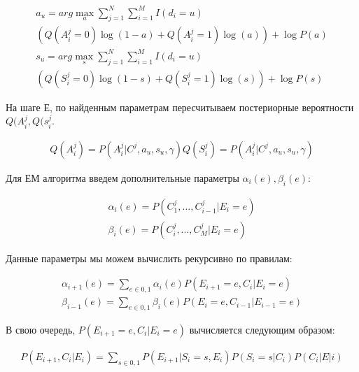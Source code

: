 \begin{subequations}
\begin{align}
	a_u=arg \max_a \sum_{j=1}^{N}\sum_{i=1}^{M}I(d_i=u) \nonumber \\
	(Q(A_{i}^{j}=0)\log(1-a)+Q(A_{i}^{j}=1)\log(a))+\log P(a) \\
	s_u=arg \max_s \sum_{j=1}^{N}\sum_{i=1}^{M}I(d_i=u) \nonumber \\
	(Q(S_{i}^{j}=0)\log(1-s)+Q(S_{i}^{j}=1)\log(s))+\log P(s)
\end{align}
\end{subequations}

На шаге Е, по найденным параметрам пересчитываем постериорные вероятности  $Q(A_{i}^{j},Q(s_{i}^{j}$.

\begin{subequations}
\begin{align}
	Q(A_{i}^{j})=P(A_{i}^{j}|C^j,a_u,s_u,\gamma)
	Q(S_{i}^{j})=P(A_{i}^{j}|C^j,a_u,s_u,\gamma)
\end{align}
\end{subequations}

Для ЕМ алгоритма введем дополнительные параметры $\alpha_i(e),\beta_i(e)$:


\begin{subequations}
\begin{align}
	\alpha_i(e)=P(C_{1}^{j},...,C_{i-1}^{j}|E_i=e) \\
	\beta_i(e)=P(C_{i}^{j},...,C_{M}^{j}|E_i=e)
\end{align}
\end{subequations}

Данные параметры мы можем вычислить рекурсивно по правилам:

\begin{subequations}
\begin{align}
	\alpha_{i+1}(e)=\sum_{e \in {0,1}}\alpha_i(e)P(E_{i+1}=e,C_i|E_i=e)\\
	\beta_{i-1}(e)=\sum_{e \in {0,1}}\beta_i(e)P(E_{i}=e,C_{i-1}|E_{i-1}=e)
\end{align}
\end{subequations}

В свою очередь, $P(E_{i+1}=e,C_i|E_i=e)$ вычисляется следующим образом:

\begin{subequations}
\begin{align}
	P(E_{i+1},C_i|E_i)=\sum_{s \in {0,1}}P(E_{i+1}|S_i=s,E_i)P(S_i=s|C_i)P(C_i|E|i)
\end{align}
\end{subequations}

